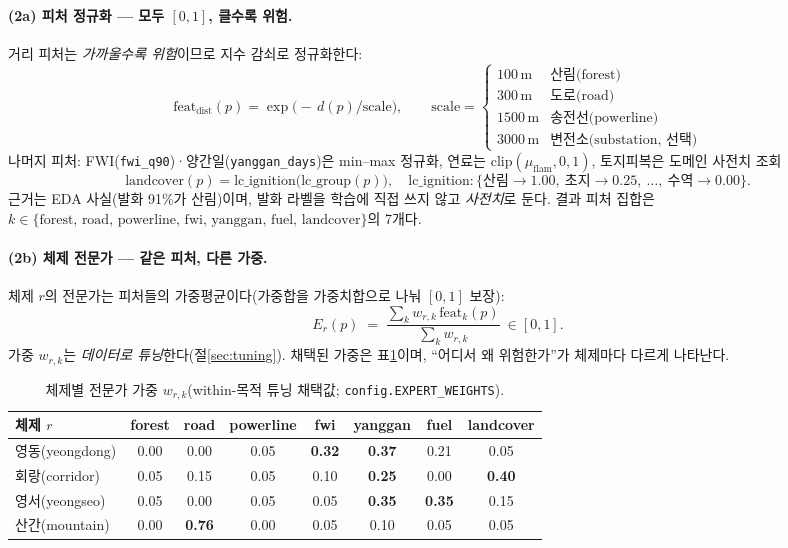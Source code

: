 \documentclass[11pt,a4paper]{article}
\newcommand{\src}[1]{{\footnotesize\color{gray}\texttt{#1}}}
\newcommand{\clip}{\mathrm{clip}}
\begin{document}
\paragraph{(2a) 피처 정규화 — 모두 $[0,1]$, 클수록 위험.}
거리 피처는 \emph{가까울수록 위험}이므로 지수 감쇠로 정규화한다:
\begin{equation}
\mathrm{feat}_{\text{dist}}(p)=\exp\!\big(-\,d(p)/\text{scale}\big),\qquad
\text{scale}=\begin{cases}
100\,\text{m} & \text{산림(forest)}\\
300\,\text{m} & \text{도로(road)}\\
1500\,\text{m} & \text{송전선(powerline)}\\
3000\,\text{m} & \text{변전소(substation, 선택)}
\end{cases}
\label{eq:decay}
\end{equation}
나머지 피처: FWI(\texttt{fwi\_q90})·양간일(\texttt{yanggan\_days})은 min--max 정규화, 연료는
$\clip(\mu_{\text{flam}},0,1)$, 토지피복은 도메인 사전치 조회
\begin{equation}
\mathrm{landcover}(p)=\mathrm{lc\_ignition}\big(\mathrm{lc\_group}(p)\big),\quad
\mathrm{lc\_ignition}:\{\text{산림}{\to}1.00,\ \text{초지}{\to}0.25,\ \dots,\ \text{수역}{\to}0.00\}.
\end{equation}
근거는 EDA 사실(발화 91\%가 산림)이며, 발화 라벨을 학습에 직접 쓰지 않고 \emph{사전치}로 둔다.
결과 피처 집합은 $k\in\{\text{forest, road, powerline, fwi, yanggan, fuel, landcover}\}$의 7개다.

\paragraph{(2b) 체제 전문가 — 같은 피처, 다른 가중.}
체제 $r$의 전문가는 피처들의 가중평균이다(가중합을 가중치합으로 나눠 $[0,1]$ 보장):
\begin{equation}
E_r(p)\;=\;\frac{\sum_{k} w_{r,k}\,\mathrm{feat}_k(p)}{\sum_{k} w_{r,k}}\ \in[0,1].
\label{eq:expert}
\end{equation}
가중 $w_{r,k}$는 \emph{데이터로 튜닝}한다(절\ref{sec:tuning}). 채택된 가중은 표\ref{tab:weights}이며,
``어디서 왜 위험한가''가 체제마다 다르게 나타난다.

\begin{table}[H]
\centering
\caption{체제별 전문가 가중 $w_{r,k}$(within-목적 튜닝 채택값; \src{config.EXPERT\_WEIGHTS}).}
\label{tab:weights}
\small
\begin{tabular}{lccccccc}
\toprule
체제 $r$ & forest & road & powerline & fwi & yanggan & fuel & landcover \\
\midrule
영동(yeongdong) & 0.00 & 0.00 & 0.05 & \textbf{0.32} & \textbf{0.37} & 0.21 & 0.05 \\
회랑(corridor)  & 0.05 & 0.15 & 0.05 & 0.10 & \textbf{0.25} & 0.00 & \textbf{0.40} \\
영서(yeongseo)  & 0.05 & 0.00 & 0.05 & 0.05 & \textbf{0.35} & \textbf{0.35} & 0.15 \\
산간(mountain)  & 0.00 & \textbf{0.76} & 0.00 & 0.05 & 0.10 & 0.05 & 0.05 \\
\bottomrule
\end{tabular}
\end{table}
\end{document}
